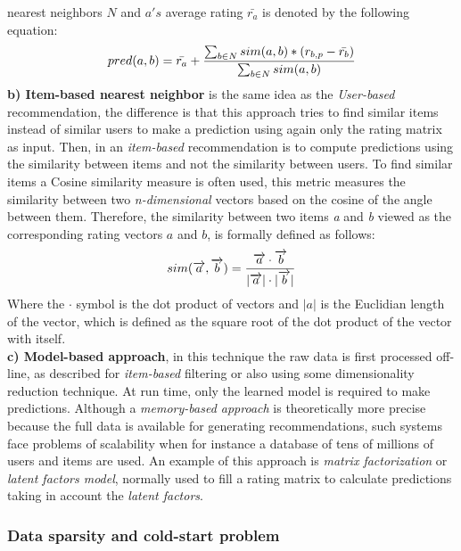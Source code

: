 nearest neighbors $N$ and $a's$ average rating $\bar{r_a}$ is denoted
by the following equation:
\begin{equation}\label{eq:prediction}
\displaystyle pred(a,b) = \bar{r_a} + 
{\sum_{b \in N} sim(a,b) * (r_{b,p}- \bar{r_b}) 
\over \sum_{b \in N} sim(a,b)} 
\end{equation}
\textbf{b) Item-based nearest neighbor} is the same idea as the \textit
{User-based} recommendation, the difference is that this approach tries to find
similar items instead of similar users to make a prediction using again only the rating
matrix as input. Then, in an \textit{item-based} recommendation is to compute
predictions using the similarity between items and not the similarity
between users. To find similar items a Cosine similarity measure is often used,
this metric measures the similarity between two
\textit{n-dimensional} vectors based on the cosine of the angle between them.
Therefore, the similarity between two items \textit{a} and \textit{b}
viewed as the corresponding rating vectors $a$ and $b$, is formally
defined as follows:
\begin{equation}\label{eq:cosine}
\displaystyle sim(\overrightarrow{a},\overrightarrow{b})= 
{\overrightarrow{a} \cdot \overrightarrow{b} \over
|\overrightarrow{a}| \cdot |\overrightarrow{b}| }
\end{equation}
Where the $\cdot$  symbol is the dot product of vectors and $|a|$ is the Euclidian length of the vector, which is defined as the square root of the dot
product of the vector with itself.\\
\textbf{c) Model-based approach}, in this technique the raw data is
first processed off-line, as described for \textit{item-based}
filtering or also using some dimensionality reduction technique. At run time,
only the learned model is required to make predictions. Although a
\textit{memory-based approach} is theoretically more precise because
the full data is available for generating recommendations, such systems
face problems of scalability when for instance a database of tens of 
millions of users and items are used. An example of this approach is
\textit{matrix factorization} or \textit{latent factors model},
normally used to fill a rating matrix to calculate predictions taking
in account the \textit{latent factors}.

\subsubsection{Data sparsity and cold-start problem}\label{coldstart}

